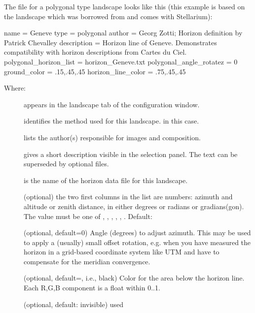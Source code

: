 The  file for a polygonal type landscape looks
like this (this example is based on the  landscape
which was borrowed from  and comes with Stellarium):

\begin{configfile}
[landscape]
name = Geneve
type = polygonal
author = Georg Zotti; Horizon definition by Patrick Chevalley
description = Horizon line of Geneve.
              Demonstrates compatibility with
              horizon descriptions from Cartes du Ciel.
polygonal_horizon_list = horizon_Geneve.txt
polygonal_angle_rotatez = 0
ground_color = .15,.45,.45
horizon_line_color = .75,.45,.45
\end{configfile}
%
Where:
\begin{description}
\item[] appears in the landscape tab of the configuration window.
\item[] identifies the method used for this landscape.  in this case.
\item[] lists the author(s) responsible for images and composition.
\item[] gives a short description visible in the
  selection panel. The text can be superseded by optional
   files.
\item[] is the name of the horizon data file for this landscape.
\item[] (optional) the two first
  columns in the list are numbers: azimuth and altitude or zenith
  distance, in either degrees or radians or gradians(gon). The value
  must be one of , , ,
    , , . Default:
\item[] (optional, default=0) Angle
  (degrees) to adjust azimuth. This may be used to apply a (usually)
  small offset rotation, e.g. when you have measured the horizon in a
  grid-based coordinate system like UTM and have to compensate for the
  meridian convergence.
\item[] (optional, default=, i.e.,
  black) Color for the area below the horizon line. Each R,G,B
  component is a float within 0..1.
\item[] (optional, default: invisible) used

\end{description}

